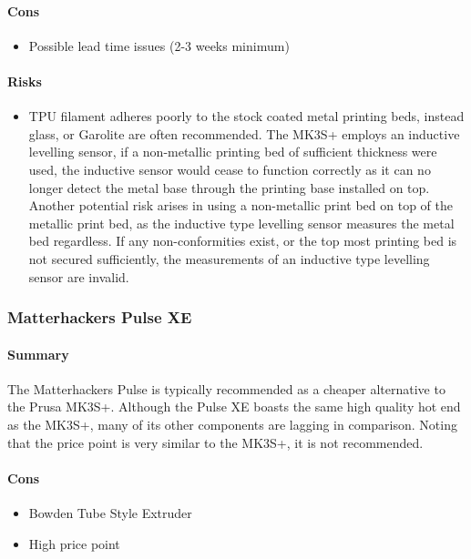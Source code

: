 \documentclass[11pt]{article}
\begin{document}
\paragraph{Cons}
\label{sec:org564196d}
\begin{itemize}
\item Possible lead time issues (2-3 weeks minimum)
\end{itemize}

\paragraph{Risks}
\label{sec:org7ebd13e}
\begin{itemize}
\item TPU filament adheres poorly to the stock coated metal printing beds, instead glass, or Garolite are often recommended. The MK3S+ employs an inductive levelling sensor, if a non-metallic printing bed of sufficient thickness were used, the inductive sensor would cease to function correctly as it can no longer detect the metal base through the printing base installed on top. Another potential risk arises in using a non-metallic print bed on top of the metallic print bed, as the inductive type levelling sensor measures the metal bed regardless. If any non-conformities exist, or the top most printing bed is not secured sufficiently, the measurements of an inductive type levelling sensor are invalid.
\end{itemize}

\subsubsection{Matterhackers Pulse XE}
\label{sec:org4f8911d}

\paragraph{Summary\\}
\label{sec:orgc003a3c}
The Matterhackers Pulse is typically recommended as a cheaper alternative to the Prusa MK3S+. Although the Pulse XE boasts the same high quality hot end as the MK3S+, many of its other components are lagging in comparison. Noting that the price point is very similar to the MK3S+, it is not recommended.

\paragraph{Cons}
\label{sec:org5a75c63}
\begin{itemize}
\item Bowden Tube Style Extruder
\item High price point
\end{itemize}
\end{document}
